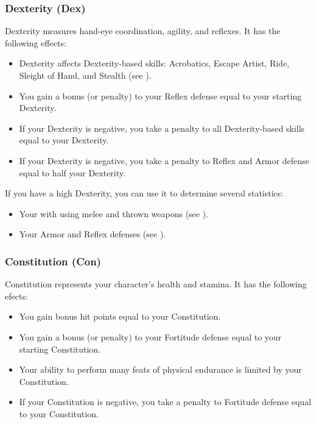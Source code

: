         \subsubsection{Dexterity (Dex)}\label{Dexterity}
            Dexterity measures hand-eye coordination, agility, and reflexes.
            It has the following effects:
            \begin{itemize}
                \item Dexterity affects Dexterity-based skills: Acrobatics, Escape Artist, Ride, Sleight of Hand, and Stealth (see ).
                \item You gain a bonus (or penalty) to your Reflex defense equal to your starting Dexterity.
                \item If your Dexterity is negative, you take a penalty to all Dexterity-based skills equal to your Dexterity.
                \item If your Dexterity is negative, you take a penalty to Reflex and Armor defense equal to half your Dexterity.
            \end{itemize}

            If you have a high Dexterity, you can use it to determine several statistics:
            \begin{itemize}
                \item Your  with  using melee and thrown weapons (see ).
                \item Your Armor and Reflex defenses (see ).
            \end{itemize}

        \subsubsection{Constitution (Con)}\label{Constitution}
            Constitution represents your character's health and stamina.
            It has the following efects:
            \begin{itemize}
                \item You gain bonus hit points equal to your Constitution.
                \item You gain a bonus (or penalty) to your Fortitude defense equal to your starting Constitution.
                \item Your ability to perform many feats of physical endurance is limited by your Constitution.
                \item If your Constitution is negative, you take a penalty to Fortitude defense equal to your Constitution.
            \end{itemize}

